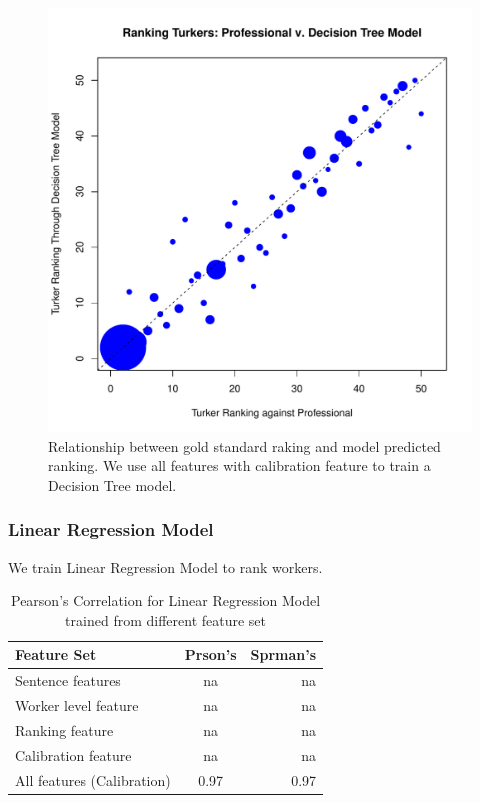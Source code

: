 \documentclass[11pt]{article}
\begin{document}
\begin{figure}[htbp]
  \centering
  \includegraphics[width=\linewidth]{AllFeatureWithCali/allfeaturewithcaliorderdt.pdf}
  \caption{Relationship between gold standard raking and model predicted ranking. We use all features with calibration feature to train a Decision Tree model. }
    \label{fdtallcalirorder}
\end{figure}

\subsubsection{Linear Regression Model}
We train Linear Regression Model to rank workers.
\begin{table}[htbp]
\begin{center}
\begin{tabular}{| l | c | r |}
\hline \bf Feature Set & \bf Prson's  &\bf Sprman's  \\ \hline
Sentence features & na & na \\
Worker level feature & na  & na \\
Ranking feature & na & na \\
Calibration feature & na& na\\
All features (Calibration)& 0.97 & 0.97 \\
\hline
\end{tabular}
\end{center}
\caption{\label{tlrpearson} Pearson's Correlation for Linear Regression Model trained from different feature set }
\end{table}
\end{document}
